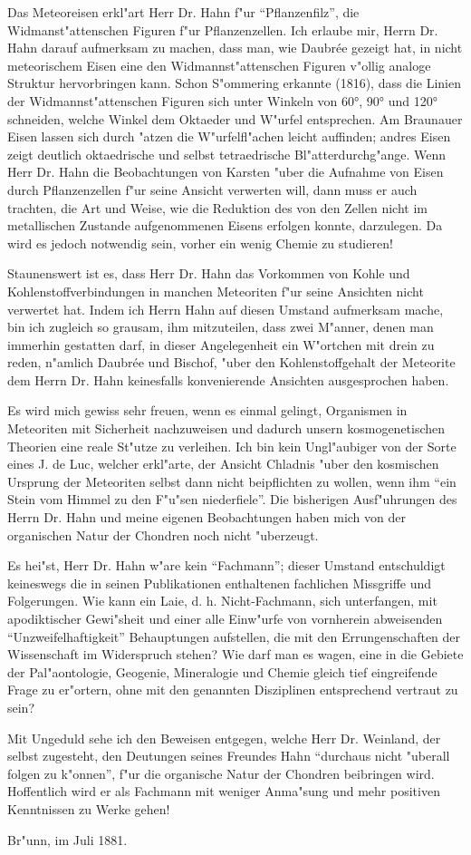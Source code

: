 \documentclass[a4paper, 12pt, oneside]{article}
\begin{document}
Das Meteoreisen erkl"art Herr Dr. Hahn f"ur "`Pflanzenfilz"', die Widmanst"attenschen Figuren f"ur Pflanzenzellen. Ich erlaube mir, Herrn Dr. Hahn darauf aufmerksam zu machen, dass man, wie Daubrée gezeigt hat, in nicht meteorischem Eisen eine den Widmannst"attenschen Figuren v"ollig analoge Struktur hervorbringen kann. Schon S"ommering erkannte (1816), dass die Linien der Widmannst"attenschen Figuren sich unter Winkeln von 60°, 90° und 120° schneiden, welche Winkel dem Oktaeder und W"urfel entsprechen. Am Braunauer Eisen lassen sich durch "atzen die W"urfelfl"achen leicht auffinden; andres Eisen zeigt deutlich oktaedrische und selbst tetraedrische Bl"atterdurchg"ange. Wenn Herr Dr. Hahn die Beobachtungen von Karsten "uber die Aufnahme von Eisen durch Pflanzenzellen f"ur seine Ansicht verwerten will, dann muss er auch trachten, die Art und Weise, wie die Reduktion des von den Zellen nicht im metallischen Zustande aufgenommenen Eisens erfolgen konnte, darzulegen. Da wird es jedoch notwendig sein, vorher ein wenig Chemie zu studieren!

Staunenswert ist es, dass Herr Dr. Hahn das Vorkommen von Kohle und Kohlenstoffverbindungen in manchen Meteoriten f"ur seine Ansichten nicht verwertet hat. Indem ich Herrn Hahn auf diesen Umstand aufmerksam mache, bin ich zugleich so grausam, ihm mitzuteilen, dass zwei M"anner, denen man immerhin gestatten darf, in dieser Angelegenheit ein W"ortchen mit drein zu reden, n"amlich Daubrée und Bischof, "uber den Kohlenstoffgehalt der Meteorite dem Herrn Dr. Hahn keinesfalls konvenierende Ansichten ausgesprochen haben.

Es wird mich gewiss sehr freuen, wenn es einmal gelingt, Organismen in Meteoriten mit Sicherheit nachzuweisen und dadurch unsern kosmogenetischen Theorien eine reale St"utze zu verleihen. Ich bin kein Ungl"aubiger von der Sorte eines J. de Luc, welcher erkl"arte, der Ansicht Chladnis "uber den kosmischen Ursprung der Meteoriten selbst dann nicht beipflichten zu wollen, wenn ihm "`ein Stein vom Himmel zu den F"u"sen niederfiele"'. Die bisherigen Ausf"uhrungen des Herrn Dr. Hahn und meine eigenen Beobachtungen haben mich von der organischen Natur der Chondren noch nicht "uberzeugt.

Es hei"st, Herr Dr. Hahn w"are kein "`Fachmann"'; dieser Umstand entschuldigt keineswegs die in seinen Publikationen enthaltenen fachlichen Missgriffe und Folgerungen. Wie kann ein Laie, d. h. Nicht-Fachmann, sich unterfangen, mit apodiktischer Gewi"sheit und einer alle Einw"urfe von vornherein abweisenden "`Unzweifelhaftigkeit"' Behauptungen aufstellen, die mit den Errungenschaften der Wissenschaft im Widerspruch stehen? Wie darf man es wagen, eine in die Gebiete der Pal"aontologie, Geogenie, Mineralogie und Chemie gleich tief eingreifende Frage zu er"ortern, ohne mit den genannten Disziplinen entsprechend vertraut zu sein?

Mit Ungeduld sehe ich den Beweisen entgegen, welche Herr Dr. Weinland, der selbst zugesteht, den Deutungen seines Freundes Hahn "`durchaus nicht "uberall folgen zu k"onnen"', f"ur die organische Natur der Chondren beibringen wird. Hoffentlich wird er als Fachmann mit weniger Anma"sung und mehr positiven Kenntnissen zu Werke gehen!

Br"unn, im Juli 1881.
\end{document}
